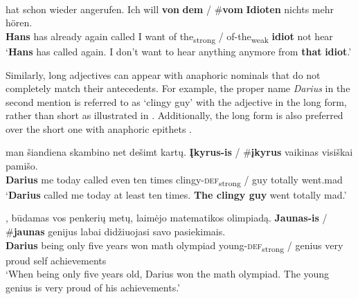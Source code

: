 \documentclass[output=paper,
modfonts
]{langscibook}
\begin{document}
\begin{exe}
	\ex \label{ex:sereikaite:40}
	 \citep[31]{Schwarz2009} \\
	 {hat} {schon} {wieder} {angerufen}. {Ich} {will} \textbf{von} \textbf{dem} \textnormal{/} \textnormal{\#}\textbf{vom} \textbf{Idioten} {nichts} {mehr} {hören}.\\
	\textbf{Hans} has already again called I want of {the\textsubscript{strong}} / \phantom{\#}of-the\textsubscript{weak} \textbf{idiot} not hear\\
	\trans `\textbf{Hans} has called again. I don’t want to hear anything anymore from \textbf{that} \textbf{idiot}.’  
\end{exe}


Similarly, long adjectives can appear with anaphoric nominals that do not completely match their antecedents. For example, the proper name \textit{Darius} in the second mention is referred to as `clingy guy' with the adjective in the long form, rather than short as illustrated in . Additionally, the long form is also preferred over the short one with anaphoric epithets .\largerpage[-2]

\begin{exe}
	\ex \label{ex:sereikaite:41}
	 {man} {šiandiena} {skambino} {net} {dešimt} {kartų}. \textbf{Įkyrus-is} \textnormal{/} \textnormal{\#}\textbf{įkyrus} {vaikinas} {visiškai} {pamišo}. \\
	\textbf{Darius} me today called even ten times {clingy-\textsc{def}\textsubscript{strong}} /  guy totally went.mad\\
	\trans `\textbf{Darius} called me today at least ten times. \textbf{The clingy guy} went totally mad.' 
\end{exe}

\begin{exe}
	\ex \label{ex:sereikaite:42}
	, {būdamas} {vos} {penkerių} {metų}, {laimėjo} {matematikos} {olimpiadą}. \textbf{Jaunas-is} \textnormal{/} \textnormal{\#}\textbf{jaunas} {genijus} {labai} {didžiuojasi} {savo} {pasiekimais}.\\
	\textbf{Darius} being only five years won math olympiad {young-\textsc{def}\textsubscript{strong}} /  genius very proud self achievements\\
	\trans `When being only five years old, Darius won the math olympiad. The young genius is very proud of his achievements.' 
\end{exe}
\end{document}
